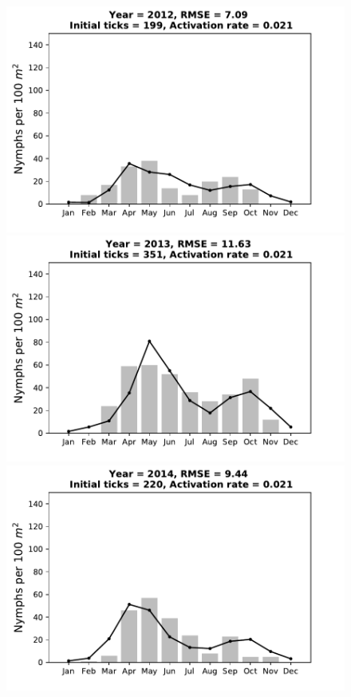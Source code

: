 \documentclass[a4paper, 11pt]{scrartcl}
\begin{document}
\begin{figure}[h!]
\begin{minipage}[c]{0.40\linewidth}
\end{minipage}
\begin{minipage}[c]{0.40\linewidth}
\includegraphics[width=\linewidth]{figures/s2/s2_2012}
\end{minipage}
\begin{minipage}[c]{0.40\linewidth}
\includegraphics[width=\linewidth]{figures/s2/s2_2013}
\end{minipage}
\begin{minipage}[c]{0.40\linewidth}
\includegraphics[width=\linewidth]{figures/s2/s2_2014}

\end{minipage}
\end{figure}
\end{document}
